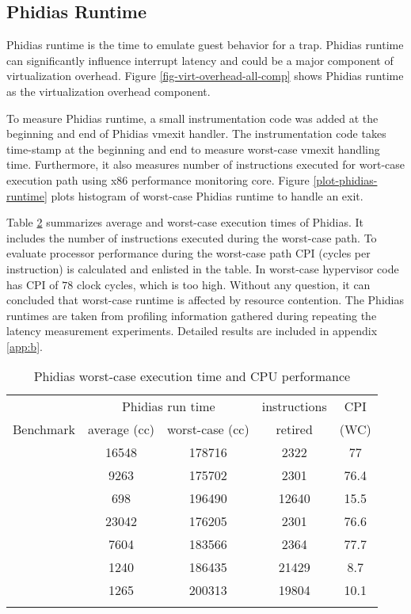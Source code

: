 

\subsection{Phidias Runtime}
Phidias runtime is the time to emulate guest behavior for a trap. 
Phidias runtime can significantly influence interrupt latency and could be a major component of virtualization overhead.
Figure \ref{fig-virt-overhead-all-comp} shows Phidias runtime as the virtualization overhead component.

To measure Phidias runtime, a small instrumentation code was added at the beginning and end of Phidias vmexit handler.
The instrumentation code takes time-stamp at the beginning and end to measure worst-case vmexit handling time.
Furthermore, it also measures number of instructions executed for wort-case execution path using x86 performance monitoring core.
Figure \ref{plot-phidias-runtime} plots histogram of worst-case Phidias runtime to handle an exit. 



Table \ref{phidias-runtime} summarizes average and worst-case execution times of Phidias. It includes the number of
instructions executed during the worst-case path. To evaluate processor performance during the worst-case path CPI (cycles per instruction)
is calculated and enlisted in the table. 
In worst-case hypervisor code has CPI of $78$ clock cycles, which is too high.
Without any question, it can concluded that worst-case runtime is affected by resource contention.
The Phidias runtimes are taken from profiling information gathered during repeating
the latency measurement experiments. Detailed results are included in appendix \ref{app:b}.

\begin{table}[H]
\centering
\begin{longtable}{|c|c|c|c|c|}  
\hline
				& \multicolumn{2}{|c|}{Phidias run time} & instructions	& CPI\\
Benchmark		& average (cc)	&	worst-case (cc)	&	retired &	(WC) \\ \hline 
\mcachepressure{}	& 16548	& 178716 & 2322 & 77\\ \hline
\mforkops{}		& 9263 & 175702 & 2301 & 76.4\\ \hline
\mfileops{}		& 698 & 196490 & 12640 & 15.5\\ \hline
\mhackbench{} 		& 23042 & 176205 & 2301 & 76.6\\ \hline
\mmmapops{} 		& 7604 & 183566 & 2364 & 77.7\\ \hline
\mstdout{} 			& 1240 & 186435 & 21429 & 8.7\\ \hline
\mthreadops{} 		& 1265 & 200313 & 19804 & 10.1\\ \hline
\caption{Phidias worst-case execution time and CPU performance} 
\label{phidias-runtime}
\end{longtable}
\end{table}


